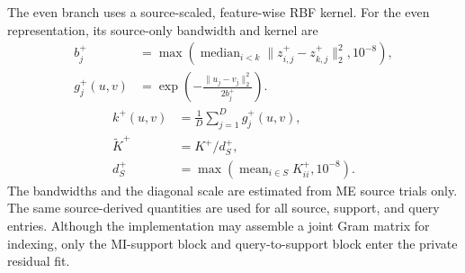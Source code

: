 \documentclass[preprint,12pt]{elsarticle}
\begin{document}
The even branch uses a source-scaled, feature-wise RBF kernel. For the even
representation, its source-only bandwidth and kernel are
\begin{equation}
\begin{aligned}
b_j^+&=\max\left(\operatorname{median}_{i<k}
\|z^+_{i,j}-z^+_{k,j}\|_2^2,10^{-8}\right),\\
g_j^+(u,v)&=\exp\left(-\frac{\|u_j-v_j\|_2^2}{2b_j^+}\right).
\end{aligned}
\end{equation}
\begin{equation}
\begin{aligned}
k^+(u,v)&=\frac{1}{D}\sum_{j=1}^{D}g_j^+(u,v),\\
\widetilde K^+&=K^+/d_S^+,\\
d_S^+&=\max\left(\operatorname{mean}_{i\in S}K^+_{ii},10^{-8}\right).
\end{aligned}
\end{equation}
The bandwidths and the diagonal scale are estimated from ME source trials
only. The same source-derived quantities are used for all source, support,
and query entries. Although the implementation may assemble a joint Gram
matrix for indexing, only the MI-support block and query-to-support block
enter the private residual fit.
\end{document}

